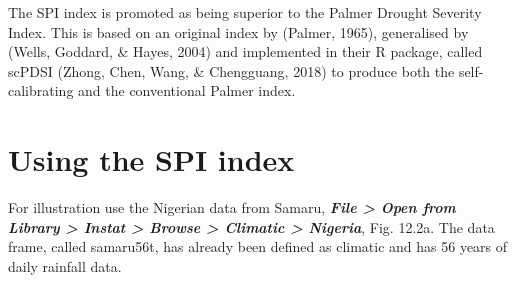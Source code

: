 \documentclass[
  letterpaper,
  DIV=11,
  numbers=noendperiod]{scrreprt}
\begin{document}
The SPI index is promoted as being superior to the Palmer Drought
Severity Index. This is based on an original index by (Palmer, 1965),
generalised by (Wells, Goddard, \& Hayes, 2004) and implemented in their
R package, called scPDSI (Zhong, Chen, Wang, \& Chengguang, 2018) to
produce both the self-calibrating and the conventional Palmer index.

\section{Using the SPI index}\label{using-the-spi-index}

For illustration use the Nigerian data from Samaru, \textbf{\emph{File
\textgreater{} Open from Library \textgreater{} Instat \textgreater{}
Browse \textgreater{} Climatic \textgreater{} Nigeria}}, Fig. 12.2a. The
data frame, called samaru56t, has already been defined as climatic and
has 56 years of daily rainfall data.
\end{document}
